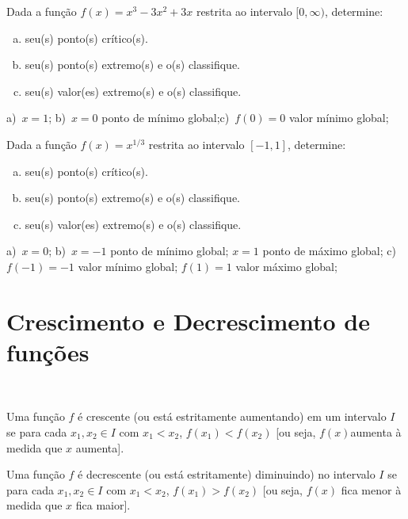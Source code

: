 \cleardoublepage\documentclass[../main.tex]{subfiles}
\begin{document}
\begin{exer}
  Dada a função $f(x)=x^{3} - 3 x^{2} + 3 x$ restrita ao intervalo $[0, \infty)$, determine:
  \begin{enumerate}[a)]
  \item seu(s) ponto(s) crítico(s).
  \item seu(s) ponto(s) extremo(s) e o(s) classifique.
  \item seu(s) valor(es) extremo(s) e o(s) classifique.
  \end{enumerate}
\end{exer}
\begin{resp}
  a)~$x=1$; b)~$x=0$ ponto de mínimo global;c)~$f(0)=0$ valor mínimo global;
\end{resp}

\begin{exer}
  Dada a função $f(x)=x^{1/3}$ restrita ao intervalo $[-1,1]$, determine:
  \begin{enumerate}[a)]
  \item seu(s) ponto(s) crítico(s).
  \item seu(s) ponto(s) extremo(s) e o(s) classifique.
  \item seu(s) valor(es) extremo(s) e o(s) classifique.
  \end{enumerate}
\end{exer}
\begin{resp}
  a)~$x=0$; b)~$x=-1$ ponto de mínimo global; $x=1$ ponto de máximo global; c)~$f(-1)=-1$ valor mínimo global; $f(1)=1$ valor máximo global;
\end{resp}
\section{Crescimento e Decrescimento de funções}\hypertarget{Func-CrescDecresc}{}\label{sec:FuncCrescDecresc}
\begin{framed}
\begin{definition}~
\begin{compactenum}[i.]
\item Uma função $f$ é crescente (ou está estritamente aumentando) em um intervalo $I$ se para cada $x_1, x_2 \in I$ com $x_1 <x_2$, $f (x_1) <f (x_2)$ [ou seja, $f (x) $aumenta à medida que $x$ aumenta].\\
\item Uma função \(f\) é decrescente (ou está estritamente) diminuindo) no intervalo $I$ se para cada $x_1, x_2 \in I$
com $x_1 <x_2$, $f (x_1) >f (x_2)$ [ou seja, $f (x) $ fica menor à medida que $x$ fica maior].
\end{compactenum}
\end{definition}
\end{framed}
\end{document}
